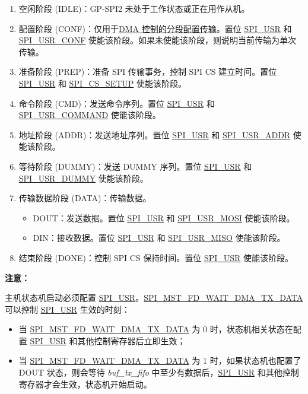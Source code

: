 \documentclass[main\_\_CN.tex]{subfiles}
\begin{document}
\begin{enumerate}
    \item 空闲阶段 (IDLE)：GP-SPI2 未处于工作状态或正在用作从机。
    \item 配置阶段 (CONF)：仅用于\hyperref[para:spi-dma-seg-conf-trans] {DMA 控制的分段配置传输}。置位 \hyperref[fielddesc:SPIUSR]{SPI\_USR} 和 \hyperref[fielddesc:SPIUSRCONF]{SPI\_USR\_CONF} 使能该阶段。如果未使能该阶段，则说明当前传输为单次传输。
    \item 准备阶段 (PREP)：准备 SPI 传输事务，控制 SPI CS 建立时间。置位 \hyperref[fielddesc:SPIUSR]{SPI\_USR} 和 \hyperref[fielddesc:SPICSSETUP]{SPI\_CS\_SETUP} 使能该阶段。
    \item\label{phase:cmd} 命令阶段 (CMD)：发送命令序列。置位 \hyperref[fielddesc:SPIUSR]{SPI\_USR} 和 \hyperref[fielddesc:SPIUSRCOMMAND]{SPI\_USR\_COMMAND} 使能该阶段。
    \item\label{phase:addr} 地址阶段 (ADDR)：发送地址序列。置位 \hyperref[fielddesc:SPIUSR]{SPI\_USR} 和 \hyperref[fielddesc:SPIUSRADDR]{SPI\_USR\_ADDR} 使能该阶段。
    \item 等待阶段 (DUMMY)：发送 DUMMY 序列。置位 \hyperref[fielddesc:SPIUSR]{SPI\_USR} 和 \hyperref[fielddesc:SPIUSRDUMMY]{SPI\_USR\_DUMMY} 使能该阶段。
    \item\label{phase:data} 传输数据阶段 (DATA)：传输数据。
    \begin{itemize}
    \item DOUT：发送数据。置位 \hyperref[fielddesc:SPIUSR]{SPI\_USR} 和 \hyperref[fielddesc:SPIUSRMOSI]{SPI\_USR\_MOSI} 使能该阶段。
    \item DIN：接收数据。置位 \hyperref[fielddesc:SPIUSR]{SPI\_USR} 和 \hyperref[fielddesc:SPIUSRMISO]{SPI\_USR\_MISO} 使能该阶段。
    \end{itemize}
    \item 结束阶段 (DONE)：控制 SPI CS 保持时间。置位 \hyperref[fielddesc:SPIUSR]{SPI\_USR} 使能该阶段。
\end{enumerate}

\textbf{注意：\\}

主机状态机启动必须配置 \hyperref[fielddesc:SPIUSR]{SPI\_USR}。\hyperref[fielddesc:SPIMSTFDWAITDMATXDATA]{SPI\_MST\_FD\_WAIT\_DMA\_TX\_DATA} 可以控制 \hyperref[fielddesc:SPIUSR]{SPI\_USR} 生效的时刻：
\begin{itemize}
    \item 当 \hyperref[fielddesc:SPIMSTFDWAITDMATXDATA]{SPI\_MST\_FD\_WAIT\_DMA\_TX\_DATA} 为 0 时，状态机相关状态在配置 \hyperref[fielddesc:SPIUSR]{SPI\_USR} 和其他控制寄存器后立即生效；
    \item 当 \hyperref[fielddesc:SPIMSTFDWAITDMATXDATA]{SPI\_MST\_FD\_WAIT\_DMA\_TX\_DATA} 为 1 时，如果状态机也配置了 DOUT 状态，则会等待 \emph{buf\_tx\_fifo} 中至少有数据后，\hyperref[fielddesc:SPIUSR]{SPI\_USR} 和其他控制寄存器才会生效，状态机开始启动。
\end{itemize}
\end{document}
